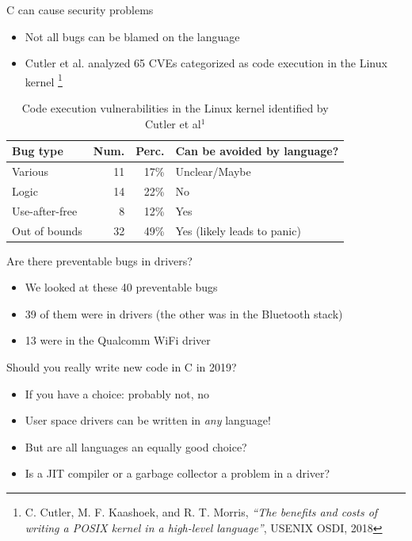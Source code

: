 \documentclass[NET,english,aspectratio=169,notitleframe]{tumbeamer}
\begin{document}
\begin{frame}{C can cause security problems}
\begin{itemize}
\item Not all bugs can be blamed on the language
\item Cutler et al. analyzed 65 CVEs categorized as code execution in the Linux kernel \footnote{C. Cutler, M. F. Kaashoek, and R. T. Morris, \emph{``The benefits and costs of writing a POSIX kernel in a high-level language''}, USENIX OSDI, 2018}
\end{itemize}
\pause
\begin{table}
\centering
\begin{tabular}{ l  r r l }
  \toprule
  Bug type & Num. & Perc. & Can be avoided by language? \\
  \midrule
  Various & 11 & 17\% & Unclear/Maybe \\
  Logic & 14 & 22\% & No \\
  Use-after-free & 8 & 12\% & Yes \\
  Out of bounds & 32 & 49\% & Yes (likely leads to panic) \\
  \bottomrule  
\end{tabular}
\caption{Code execution vulnerabilities in the Linux kernel identified by Cutler et al$^1$}
\end{table}
\end{frame}

\begin{frame}{Are there preventable bugs in drivers?}
\begin{itemize}
\item We looked at these 40 preventable bugs
\pause
\item 39 of them were in drivers (the other was in the Bluetooth stack)
\pause
\item 13 were in the Qualcomm WiFi driver
\end{itemize}
\end{frame}

\begin{frame}{Should you really write new code in C in 2019?}
\begin{itemize}
\item If you have a choice: probably not, no
\pause
\item User space drivers can be written in \emph{any} language!
\item But are all languages an equally good choice?
\item Is a JIT compiler or a garbage collector a problem in a driver?
\end{itemize}
\end{frame}
\end{document}

